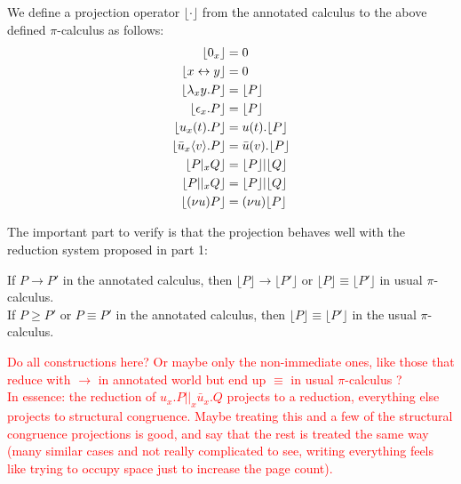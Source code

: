 \begin{definition}
We define a projection operator $\lfloor\cdot\rfloor$ from the annotated calculus to the above defined $\pi$-calculus as follows:\\
\begin{align*}
\lfloor 0_x \rfloor &= 0 \\
\lfloor x \leftrightarrow y \rfloor &= 0 \\
\lfloor \lambda_xy.P \rfloor &= \lfloor P \rfloor \\
\lfloor \epsilon_x.P \rfloor &= \lfloor P \rfloor \\
\lfloor u_x(t).P \rfloor &= u(t).\lfloor P \rfloor \\
\lfloor \bar{u}_x\langle v\rangle.P \rfloor &= \bar{u}(v).\lfloor P \rfloor \\
\lfloor P |_x Q \rfloor &= \lfloor P \rfloor | \lfloor Q \rfloor \\
\lfloor P ||_x Q \rfloor &= \lfloor P \rfloor | \lfloor Q \rfloor \\
\lfloor (\nu u)P \rfloor &= (\nu u)\lfloor P \rfloor
\end{align*}
\end{definition}

The important part to verify is that the projection behaves well with the reduction system proposed in part 1:

\begin{proposition}
If $P \to P'$ in the annotated calculus, then $\lfloor P \rfloor \to \lfloor P' \rfloor$ or $\lfloor P \rfloor \equiv \lfloor P' \rfloor$ in usual $\pi$-calculus.\\
If $P \geq P'$ or $P \equiv P'$ in the annotated calculus, then $\lfloor P \rfloor \equiv \lfloor P' \rfloor$ in the usual $\pi$-calculus.
\end{proposition}

\begin{myproof}
\textcolor{red}{Do all constructions here? Or maybe only the non-immediate ones, like those that reduce with $\to$ in annotated world but end up $\equiv$ in usual $\pi$-calculus ?\\
In essence: the reduction of $u_x.P||_x\bar{u}_x.Q$ projects to a reduction, everything else projects to structural congruence. Maybe treating this and a few of the structural congruence projections is good, and say that the rest is treated the same way (many similar cases and not really complicated to see, writing everything feels like trying to occupy space just to increase the page count).} %
\end{myproof}

